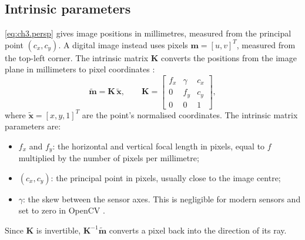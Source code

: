 \subsection{Intrinsic parameters}
\label{subsec:ch3.intrinsics}
\autoref{eq:ch3.persp} gives image positions in millimetres, measured from the principal point $(c_x, c_y)$.
A digital image instead uses pixels $\mathbf{m} = [u, v]^T$, measured from the top-left corner. 
The intrinsic matrix $\mathbf{K}$ converts the positions from the image plane in millimeters to pixel coordinates \cite{zhangFlexibleNewTechnique2000}:
\begin{equation}
	\tilde{\mathbf{m}} = \mathbf{K}\,\tilde{\mathbf{x}},
	\qquad
	\mathbf{K} =
	\begin{bmatrix}
		f_x & \gamma & c_x \\
		0   & f_y    & c_y \\
		0      & 0      & 1
	\end{bmatrix},
	\label{eq:ch3.K}
\end{equation}
where $\tilde{\mathbf{x}} = [x, y, 1]^T$ are the point's normalised coordinates. The intrinsic matrix parameters are:
\begin{itemize}
	\item $f_x$ and $f_y$: the horizontal and vertical focal length in pixels, equal to $f$ multiplied by the number of pixels per millimetre;
	\item $(c_x, c_y)$: the principal point in pixels, usually close to the image centre;
	\item $\gamma$: the skew between the sensor axes. This is negligible for modern sensors 
	and set to zero in OpenCV \cite{opencvCameraCalibration3DLink}.
\end{itemize}

Since $\mathbf{K}$ is invertible, $\mathbf{K}^{-1}\tilde{\mathbf{m}}$ converts a pixel back into the direction of its ray. 


